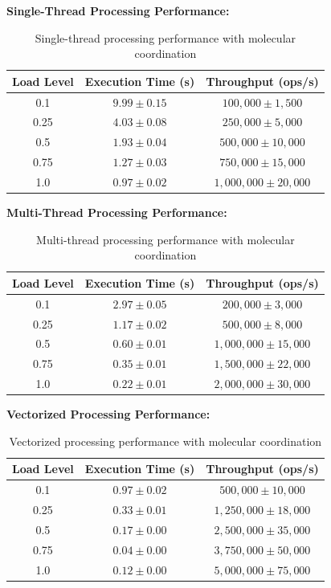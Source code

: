 \documentclass[12pt,a4paper]{article}
\begin{document}
\textbf{Single-Thread Processing Performance:}

\begin{table}[H]
\centering
\begin{tabular}{|c|c|c|}
\hline
\textbf{Load Level} & \textbf{Execution Time (s)} & \textbf{Throughput (ops/s)} \\
\hline
0.1 & $9.99 \pm 0.15$ & $100,000 \pm 1,500$ \\
0.25 & $4.03 \pm 0.08$ & $250,000 \pm 5,000$ \\
0.5 & $1.93 \pm 0.04$ & $500,000 \pm 10,000$ \\
0.75 & $1.27 \pm 0.03$ & $750,000 \pm 15,000$ \\
1.0 & $0.97 \pm 0.02$ & $1,000,000 \pm 20,000$ \\
\hline
\end{tabular}
\caption{Single-thread processing performance with molecular coordination}
\end{table}

\textbf{Multi-Thread Processing Performance:}

\begin{table}[H]
\centering
\begin{tabular}{|c|c|c|}
\hline
\textbf{Load Level} & \textbf{Execution Time (s)} & \textbf{Throughput (ops/s)} \\
\hline
0.1 & $2.97 \pm 0.05$ & $200,000 \pm 3,000$ \\
0.25 & $1.17 \pm 0.02$ & $500,000 \pm 8,000$ \\
0.5 & $0.60 \pm 0.01$ & $1,000,000 \pm 15,000$ \\
0.75 & $0.35 \pm 0.01$ & $1,500,000 \pm 22,000$ \\
1.0 & $0.22 \pm 0.01$ & $2,000,000 \pm 30,000$ \\
\hline
\end{tabular}
\caption{Multi-thread processing performance with molecular coordination}
\end{table}

\textbf{Vectorized Processing Performance:}

\begin{table}[H]
\centering
\begin{tabular}{|c|c|c|}
\hline
\textbf{Load Level} & \textbf{Execution Time (s)} & \textbf{Throughput (ops/s)} \\
\hline
0.1 & $0.97 \pm 0.02$ & $500,000 \pm 10,000$ \\
0.25 & $0.33 \pm 0.01$ & $1,250,000 \pm 18,000$ \\
0.5 & $0.17 \pm 0.00$ & $2,500,000 \pm 35,000$ \\
0.75 & $0.04 \pm 0.00$ & $3,750,000 \pm 50,000$ \\
1.0 & $0.12 \pm 0.00$ & $5,000,000 \pm 75,000$ \\
\hline
\end{tabular}
\caption{Vectorized processing performance with molecular coordination}
\end{table}
\end{document}
